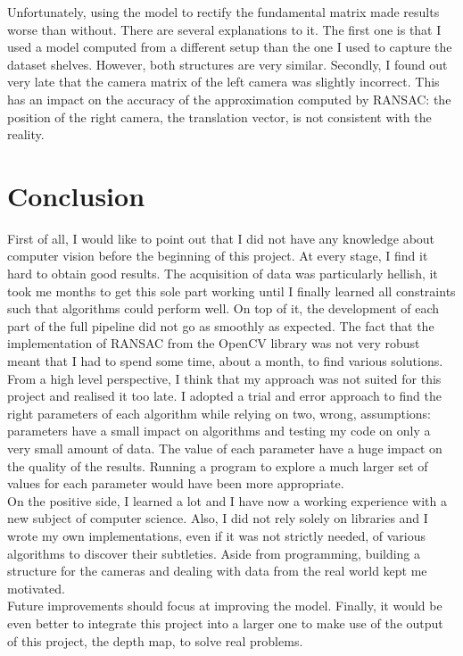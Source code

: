\documentclass[11pt]{report}
\begin{document}
Unfortunately, using the model to rectify the fundamental matrix made results worse than without. There are several explanations to it. The first one is that I used a model computed from a different setup than the one I used to capture the dataset shelves. However, both structures are very similar. Secondly, I found out very late that the camera matrix of the left camera was slightly incorrect. This has an impact on the accuracy of the approximation computed by RANSAC: the position of the right camera, the translation vector, is not consistent with the reality.

\chapter*{Conclusion}
\label{chap:Conclusion}
First of all, I would like to point out that I did not have any knowledge about computer vision before the beginning of this project. At every stage, I find it hard to obtain good results. The acquisition of data was particularly hellish, it took me months to get this sole part working until I finally learned all constraints such that algorithms could perform well. On top of it, the development of each part of the full pipeline did not go as smoothly as expected. The fact that the implementation of RANSAC from the OpenCV library was not very robust meant that I had to spend some time, about a month, to find various solutions. From a high level perspective, I think that my approach was not suited for this project and realised it too late. I adopted a trial and error approach to find the right parameters of each algorithm while relying on two, wrong, assumptions: parameters have a small impact on algorithms and testing my code on only a very small amount of data. The value of each parameter have a huge impact on the quality of the results. Running a program to explore a much larger set of values for each parameter would have been more appropriate.
\\
On the positive side, I learned a lot and I have now a working experience with a new subject of computer science. Also, I did not rely solely on libraries and I wrote my own implementations, even if it was not strictly needed, of various algorithms to discover their subtleties. Aside from programming, building a structure for the cameras and dealing with data from the real world kept me motivated.
\\
Future improvements should focus at improving the model. Finally, it would be even better to integrate this project into a larger one to make use of the output of this project, the depth map, to solve real problems.

\clearpage


\end{document}
